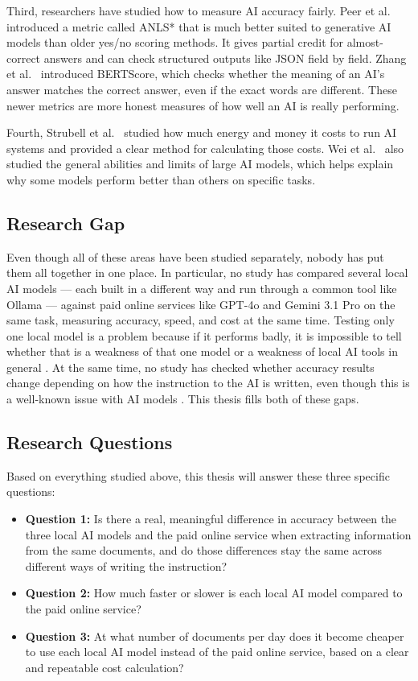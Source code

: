 Third, researchers have studied how to measure AI accuracy fairly. Peer et al.\ \cite{anlsstar_2024} introduced a metric called ANLS* that is much better suited to generative AI models than older yes/no scoring methods. It gives partial credit for almost-correct answers and can check structured outputs like JSON field by field. Zhang et al.\ \cite{zhang_bertscore_2020} introduced BERTScore, which checks whether the meaning of an AI's answer matches the correct answer, even if the exact words are different. These newer metrics are more honest measures of how well an AI is really performing.

Fourth, Strubell et al.\ \cite{strubell2019energy} studied how much energy and money it costs to run AI systems and provided a clear method for calculating those costs. Wei et al.\ \cite{wei2022emergent} also studied the general abilities and limits of large AI models, which helps explain why some models perform better than others on specific tasks.

\subsection{Research Gap}

Even though all of these areas have been studied separately, nobody has put them all together in one place. In particular, no study has compared several local AI models --- each built in a different way and run through a common tool like Ollama --- against paid online services like GPT-4o \cite{openai_gpt4o_2024} and Gemini 3.1 Pro \cite{google_gemini_2025} on the same task, measuring accuracy, speed, and cost at the same time. Testing only one local model is a problem because if it performs badly, it is impossible to tell whether that is a weakness of that one model or a weakness of local AI tools in general \cite{gemma4_phi4_qwen3_2026}. At the same time, no study has checked whether accuracy results change depending on how the instruction to the AI is written, even though this is a well-known issue with AI models \cite{anlsstar_2024}. This thesis fills both of these gaps.

\subsection{Research Questions}

Based on everything studied above, this thesis will answer these three specific questions:

\begin{itemize}
    \item \textbf{Question 1:} Is there a real, meaningful difference in accuracy between the three local AI models and the paid online service when extracting information from the same documents, and do those differences stay the same across different ways of writing the instruction?
    \item \textbf{Question 2:} How much faster or slower is each local AI model compared to the paid online service?
    \item \textbf{Question 3:} At what number of documents per day does it become cheaper to use each local AI model instead of the paid online service, based on a clear and repeatable cost calculation?
\end{itemize}
